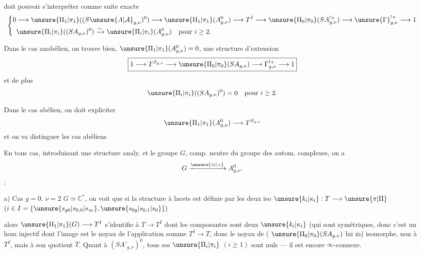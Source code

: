 
doit pouvoir s'interpréter comme suite exacte
\[
\left\{\begin{aligned}
0&\longrightarrow\unsure{\Pi_1|\pi_1}((S\unsure{A|\mathcal A}_{g,\nu})^0)
\longrightarrow\unsure{\Pi_1|\pi_1}(A_{g,\nu}^0)
\longrightarrow T^I\longrightarrow\unsure{\Pi_0|\pi_0}(SA_{g,\nu}^{!+})
\longrightarrow\unsure{\Gamma}_{g,\nu}^{!+}\longrightarrow1\\
&\unsure{\Pi_i|\pi_i}((SA_{g,\nu})^0)\xrightarrow{\sim}
\unsure{\Pi_i|\pi_i}(A_{g,\nu}^0)\quad\text{pour }i\geq2.
\end{aligned}\right.
\]

Dans le cas anabélien, on trouve bien, 
$\unsure{\Pi_1|\pi_1}(A_{g,\nu}^0)=0$, une structure d'extension
\[
\boxed{1\longrightarrow T^{S_{g,\nu}}\longrightarrow
\unsure{\Pi_0|\pi_0}(SA_{g,\nu})\longrightarrow\Gamma_{g,\nu}^{!+}\longrightarrow1}
\]
et de plus
\[
\unsure{\Pi_i|\pi_i}((SA_{g,\nu})^0)=0\quad\text{pour }i\geq2.
\]

Dans le cas abélien, on doit expliciter
\[
\unsure{\Pi_1|\pi_1}(A_{g,\nu}^0)\longrightarrow T^{S_{g,\nu}}
\]
et on va distinguer les  cas abéliens

En tous cas, introduisant une structure analy.  et le groupe $G$, comp. neutre du groupe des autom. complexes, on a
\[
G\xrightarrow{\unsure{\approx|\sim}}A_{g,\nu}^0.
\]
 :

a) Cas $g=0$, $\nu=2$ 
$G\simeq\mathbb C^*$, 
on voit que si la structure à lacets  est définie par les deux iso
$\unsure{k_i|\kappa_i}:T\longrightarrow\unsure{\pi|\Pi}$
$(i\in I=\{\unsure{s_{g0}|s_{0,0}|s_\infty},\unsure{s_{0g}|s_{0,1}|s_0}\})$


alors $\unsure{\Pi_1|\pi_1}(G)\longrightarrow T^I$ s'identifie à
$T\longrightarrow T^I$ dont les composantes sont  deux
$\unsure{k_i|\kappa_i}$ (qui sont symétriques, donc c'est un hom injectif dont l'image est le noyau de l'application somme
$T^I\longrightarrow T$, donc  le noyau de
( $\unsure{\Pi_0|\pi_0}(SA_{g,\nu})$ lui $\overline{\mathrm m}$)
 isomorphe, non à $T^I$, mais à son quotient $T$.
Quant à $(SA'_{g,\nu})^0$, tous ses $\unsure{\Pi_i|\pi_i}$ $(i\geq1)$ sont nuls --- il est encore $\infty$-connexe.

